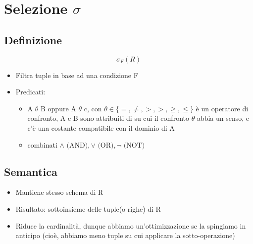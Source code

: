 \section{Selezione $\sigma$}
\subsection{Definizione}
$$
\sigma_F(R)
$$
\begin{itemize}
    \item Filtra tuple in base ad una condizione F
    \item Predicati:
    \begin{itemize}
        \item A $\theta$ B oppure A  $\theta$ c, con $\theta \in \{=, \not=, >, >, \geq, \leq\}$ è un operatore di confronto, A e B sono attribuiti di su cui il confronto $\theta$ abbia un senso, e c'è una costante compatibile con il dominio di A
        \item combinati $\land \text{ (AND)}, \lor \text{ (OR)}, \neg \text{ (NOT)}$
    \end{itemize}
\end{itemize}

\subsection{Semantica}
\begin{itemize}
    \item Mantiene stesso schema di R
    \item Risultato: sottoinsieme delle tuple(o righe) di R
    \item Riduce la cardinalità, dunque abbiamo un'ottimizzazione se la spingiamo in anticipo (cioè, abbiamo meno tuple su cui applicare la sotto-operazione)
\end{itemize}

